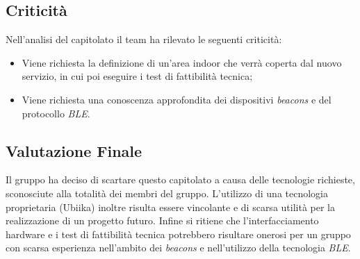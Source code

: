   
\subsection{Criticità}
Nell'analisi del capitolato il team ha rilevato le seguenti criticità:
\begin{itemize} 
\item Viene richiesta la definizione di un'area indoor che verrà coperta dal nuovo servizio, in cui poi eseguire i test di fattibilità tecnica;
\item Viene richiesta una conoscenza approfondita dei dispositivi \textit{beacons} e del protocollo \textit{BLE}.
\end{itemize}


\subsection{Valutazione Finale}
Il gruppo ha deciso di scartare questo capitolato a causa delle tecnologie richieste, sconosciute alla totalità dei membri del gruppo. L'utilizzo di una tecnologia proprietaria (Ubiika) inoltre risulta essere vincolante e di scarsa utilità per la realizzazione di un progetto futuro. Infine si ritiene che l'interfacciamento hardware e i test di fattibilità tecnica potrebbero risultare onerosi per un gruppo con scarsa esperienza nell'ambito dei \textit{beacons} e nell'utilizzo della tecnologia \textit{BLE}.  

